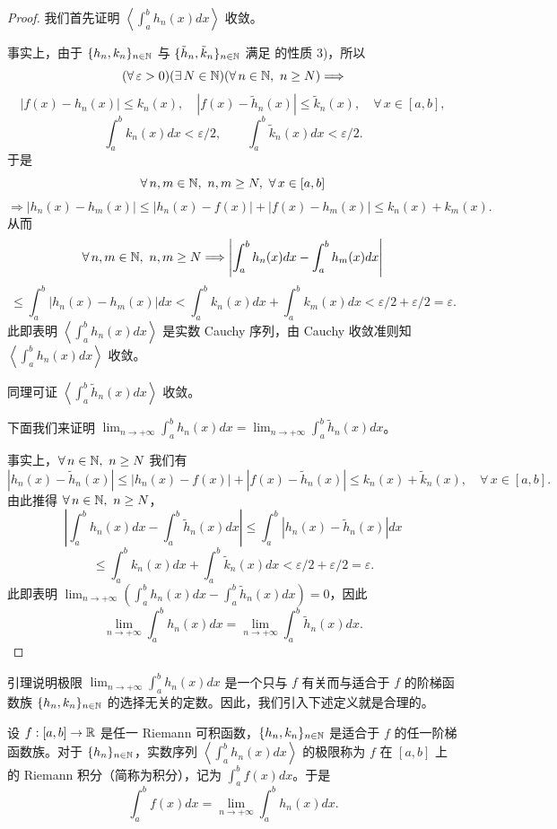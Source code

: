 \begin{proof}

	我们首先证明 \(\left\langle\int_a^b h_n(x)dx\right\rangle\) 收敛。

	事实上，由于 \(\{h_n,k_n\}_{n\in\mathbb{N}}\) 与 \(\{\tilde h_n,\tilde k_n\}_{n\in\mathbb{N}}\) 满足 的性质 3)，所以
	\[
	(\forall\,\varepsilon>0)(\exists\,N\in\N)(\forall\,n\in\N,\ n\ge N)\Longrightarrow
	\]
	\[
	|f(x)-h_n(x)|\le k_n(x),\quad |f(x)-\tilde h_n(x)|\le\tilde k_n(x),\quad\forall\,x\in[a,b],
	\]
	\[
	\int_a^b k_n(x)dx<\varepsilon/2,\qquad\int_a^b\tilde k_n(x)dx<\varepsilon/2.
	\]
	于是
	\[
	\forall\,n,m\in\N,\ n,m\ge N,\ \forall\,x\in[a,b]
	\]
	\[
	\Longrightarrow|h_n(x)-h_m(x)|\le|h_n(x)-f(x)|+|f(x)-h_m(x)|\le k_n(x)+k_m(x).
	\]
	从而
	\[
	\forall\,n,m\in\mathbb{N},\ n,m\ge N\Longrightarrow\left|\int_a^b h_n(x)dx-\int_a^b h_m(x)dx\right|
	\]
	\[
	\le\int_a^b|h_n(x)-h_m(x)|dx<\int_a^b k_n(x)dx+\int_a^b k_m(x)dx<\varepsilon/2+\varepsilon/2=\varepsilon.
	\]
	此即表明 \(\left\langle\int_a^b h_n(x)dx\right\rangle\) 是实数 Cauchy 序列，由 Cauchy 收敛准则知 \(\left\langle\int_a^b h_n(x)dx\right\rangle\) 收敛。

	同理可证 \(\left\langle\int_a^b\tilde h_n(x)dx\right\rangle\) 收敛。

	下面我们来证明 \(\displaystyle\lim_{n\to+\infty}\int_a^b h_n(x)dx=\lim_{n\to+\infty}\int_a^b\tilde h_n(x)dx\)。

	事实上，\(\forall\,n\in\mathbb{N},\ n\ge N\) 我们有
	\[
	|h_n(x)-\tilde h_n(x)|\le|h_n(x)-f(x)|+|f(x)-\tilde h_n(x)|\le k_n(x)+\tilde k_n(x),\quad\forall\,x\in[a,b].
	\]
	由此推得 \(\forall\,n\in\mathbb{N},\ n\ge N\)，
	\[
	\left|\int_a^b h_n(x)dx-\int_a^b\tilde h_n(x)dx\right|\le\int_a^b|h_n(x)-\tilde h_n(x)|dx
	\]
	\[
	\le\int_a^b k_n(x)dx+\int_a^b\tilde k_n(x)dx<\varepsilon/2+\varepsilon/2=\varepsilon.
	\]
	此即表明 \(\displaystyle\lim_{n\to+\infty}\left(\int_a^b h_n(x)dx-\int_a^b\tilde h_n(x)dx\right)=0\)，因此
	\[
	\lim_{n\to+\infty}\int_a^b h_n(x)dx=\lim_{n\to+\infty}\int_a^b\tilde h_n(x)dx.
	\]

\end{proof}

引理说明极限 \(\displaystyle\lim_{n\to+\infty}\int_a^b h_n(x)dx\) 是一个只与 \(f\) 有关而与适合于 \(f\) 的阶梯函数族 \(\{h_n,k_n\}_{n\in\mathbb{N}}\) 的选择无关的定数。因此，我们引入下述定义就是合理的。

\begin{mydef*}{}

	设 \(f:[a,b]\to\mathbb{R}\) 是任一 Riemann 可积函数，\(\{h_n,k_n\}_{n\in\mathbb{N}}\) 是适合于 \(f\) 的任一阶梯函数族。对于 \(\{h_n\}_{n\in\mathbb{N}}\)，实数序列 \(\left\langle\int_a^b h_n(x)dx\right\rangle\) 的极限称为 \(f\) 在 \([a,b]\) 上的 Riemann 积分（简称为积分），记为 \(\displaystyle\int_a^b f(x)dx\)。于是
	\[
	\int_a^b f(x)dx=\lim_{n\to+\infty}\int_a^b h_n(x)dx.
	\]

\end{mydef*}

